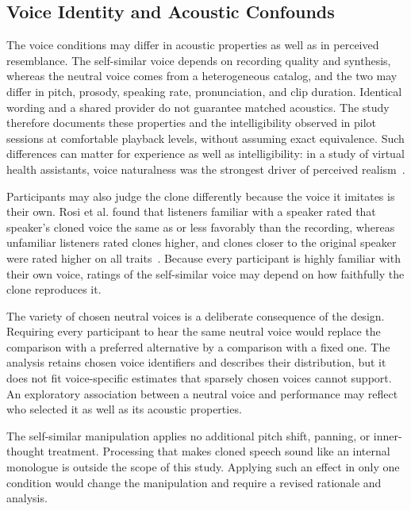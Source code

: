 \subsection{Voice Identity and Acoustic Confounds}
The voice conditions may differ in acoustic properties as well as in perceived resemblance. The self-similar voice depends on recording quality and synthesis, whereas the neutral voice comes from a heterogeneous catalog, and the two may differ in pitch, prosody, speaking rate, pronunciation, and clip duration. Identical wording and a shared provider do not guarantee matched acoustics. The study therefore documents these properties and the intelligibility observed in pilot sessions at comfortable playback levels, without assuming exact equivalence. Such differences can matter for experience as well as intelligibility: in a study of virtual health assistants, voice naturalness was the strongest driver of perceived realism~\cite{maxim2025realism}.

Participants may also judge the clone differently because the voice it imitates is their own. Rosi et al. found that listeners familiar with a speaker rated that speaker's cloned voice the same as or less favorably than the recording, whereas unfamiliar listeners rated clones higher, and clones closer to the original speaker were rated higher on all traits~\cite{mcgettigan2025cloned}. Because every participant is highly familiar with their own voice, ratings of the self-similar voice may depend on how faithfully the clone reproduces it.

The variety of chosen neutral voices is a deliberate consequence of the design. Requiring every participant to hear the same neutral voice would replace the comparison with a preferred alternative by a comparison with a fixed one. The analysis retains chosen voice identifiers and describes their distribution, but it does not fit voice-specific estimates that sparsely chosen voices cannot support. An exploratory association between a neutral voice and performance may reflect who selected it as well as its acoustic properties.

The self-similar manipulation applies no additional pitch shift, panning, or inner-thought treatment. Processing that makes cloned speech sound like an internal monologue is outside the scope of this study. Applying such an effect in only one condition would change the manipulation and require a revised rationale and analysis.

